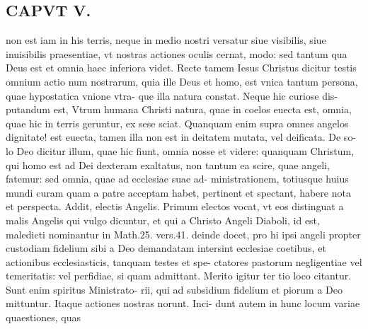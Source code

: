 \documentclass{article}
\begin{document}
\begin{pages}
\section*{CAPVT  V. }
\marginpar{[ p.3 ]}\pstart non est iam in his terris, neque in medio nostri versatur siue visibilis, siue inuisibilis praesentiae, vt nostras actiones oculis cernat, modo: sed tantum qua Deus est et omnia haec inferiora videt. Recte tamem Iesus Christus dicitur testis omnium actio num nostrarum, quia ille Deus et homo, est vnica tantum persona, quae hypostatica vnione vtra- que illa natura constat. Neque hic curiose dis- putandum est, Vtrum humana Christi natura, quae in coelos euecta est, omnia, quae hic in terris geruntur, ex sese sciat. Quanquam enim supra omnes angelos dignitate! est euecta, tamen illa non est in deitatem mutata, vel deificata. De so- lo Deo dicitur illum, quae hic fiunt, omnia nosse et videre: quanquam Christum, qui homo est ad Dei dexteram exaltatus, non tantum ea scire, quae angeli, fatemur: sed omnia, quae ad ecclesiae suae ad- ministrationem, totiusque huius mundi curam quam a patre acceptam habet, pertinent et spectant, habere nota et perspecta. Addit, electis Angelis. Primum electos vocat, vt eos distinguat a malis Angelis qui vulgo dicuntur, et qui a Christo Angeli Diaboli, id est, maledicti nominantur in Math.25. vers.41. deinde docet, pro hi ipsi angeli propter custodiam fidelium sibi a Deo demandatam intersint ecclesiae coetibus, et actionibus ecclesiasticis, tanquam testes et spe- ctatores pastorum negligentiae vel temeritatis: vel perfidiae, si quam admittant. Merito igitur ter tio loco citantur. Sunt enim spiritus Ministrato- rii, qui ad subsidium fidelium et piorum a Deo mittuntur. Itaque actiones nostras norunt. Inci- dunt autem in hunc locum variae quaestiones, quas  \pend

\end{pages}
\end{document}
